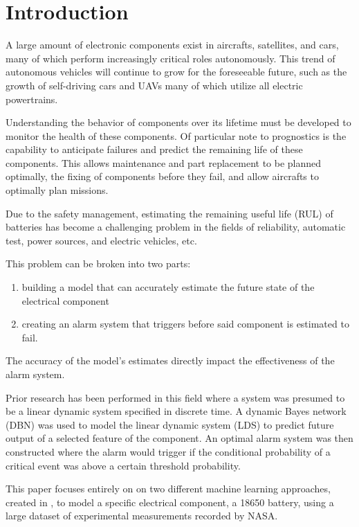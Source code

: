 
\section{Introduction}

A large amount of electronic components exist in aircrafts, satellites, and cars, many of which perform increasingly critical roles autonomously.  This trend of autonomous vehicles will continue to grow for the foreseeable future, such as the growth of self-driving cars and UAVs many of which utilize all electric powertrains.

Understanding the behavior of components over its lifetime must be developed to monitor the health of these components.  Of particular note to prognostics is the capability to anticipate failures and predict the remaining life of these components.  This allows maintenance and part replacement to be planned optimally, the fixing of components before they fail, and allow aircrafts to optimally plan missions.

Due to the safety management, estimating the remaining useful life (RUL) of \lib batteries has become a challenging problem in the fields of reliability, automatic test, power sources, and electric vehicles, etc. 

This problem can be broken into two parts: 
\begin{enumerate}
\item building a model that can accurately estimate the future state of the electrical component
\item creating an alarm system that triggers before said component is estimated to fail.  
\end{enumerate}
The accuracy of the model’s estimates directly impact the effectiveness of the alarm system.

Prior research has been performed in this field where a system was presumed to be a linear dynamic system specified in discrete time.  A dynamic Bayes network (DBN) was used to model the linear dynamic system (LDS) to predict future output of a selected feature of the component.  An optimal alarm system was then constructed where the alarm would trigger if the conditional probability of a critical event was above a certain threshold probability.

This paper focuses entirely on on two different machine learning approaches, created in \MATLAB, to model a specific electrical component, a 18650 \lib battery, using a large dataset of experimental measurements recorded by NASA.




